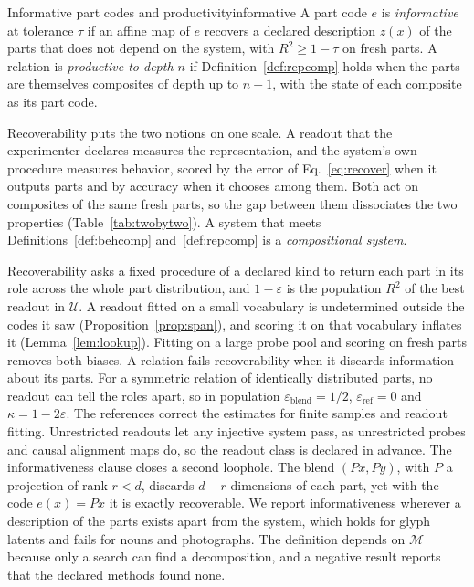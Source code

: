 \documentclass[10pt]{article}
\theoremstyle{plain}
\theoremstyle{remark}
\newcommand{\U}{\mathcal{U}}
\newcommand{\M}{\mathcal{M}}
\begin{document}
\begin{defbox}{Informative part codes and productivity}{informative}
A part code $e$ is \emph{informative} at tolerance $\tau$ if an affine map of $e$ recovers a declared description $z(x)$ of the parts that does not depend on the system, with $R^2 \ge 1 - \tau$ on fresh parts. A relation is \emph{productive to depth $n$} if Definition~\ref{def:repcomp} holds when the parts are themselves composites of depth up to $n - 1$, with the state of each composite as its part code.
\end{defbox}

Recoverability puts the two notions on one scale. A readout that the experimenter declares measures the representation, and the system's own procedure measures behavior, scored by the error of Eq.~\ref{eq:recover} when it outputs parts and by accuracy when it chooses among them. Both act on composites of the same fresh parts, so the gap between them dissociates the two properties (Table~\ref{tab:twobytwo}). A system that meets Definitions~\ref{def:behcomp} and~\ref{def:repcomp} is a \emph{compositional system}.

Recoverability asks a fixed procedure of a declared kind to return each part in its role across the whole part distribution, and $1 - \varepsilon$ is the population $R^2$ of the best readout in $\U$. A readout fitted on a small vocabulary is undetermined outside the codes it saw (Proposition~\ref{prop:span}), and scoring it on that vocabulary inflates it (Lemma~\ref{lem:lookup}). Fitting on a large probe pool and scoring on fresh parts removes both biases. A relation fails recoverability when it discards information about its parts. For a symmetric relation of identically distributed parts, no readout can tell the roles apart, so in population $\varepsilon_{\mathrm{blend}} = 1/2$, $\varepsilon_{\mathrm{ref}} = 0$ and $\kappa = 1 - 2\varepsilon$. The references correct the estimates for finite samples and readout fitting. Unrestricted readouts let any injective system pass, as unrestricted probes \citep{hewitt2019} and causal alignment maps \citep{sutter2025} do, so the readout class is declared in advance. The informativeness clause closes a second loophole. The blend $(Px, Py)$, with $P$ a projection of rank $r < d$, discards $d - r$ dimensions of each part, yet with the code $e(x) = Px$ it is exactly recoverable. We report informativeness wherever a description of the parts exists apart from the system, which holds for glyph latents and fails for nouns and photographs. The definition depends on $\M$ because only a search can find a decomposition, and a negative result reports that the declared methods found none.
\end{document}
